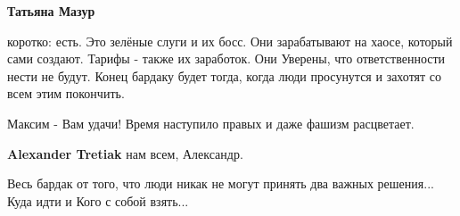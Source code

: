 \begin{itemize}
\begin{itemize} %
\textbf{Татьяна Мазур} 

коротко: есть. Это зелёные слуги и их босс. Они зарабатывают на хаосе, который
сами создают. Тарифы - также их заработок. Они Уверены, что ответственности
нести не будут. Конец бардаку будет тогда, когда люди просунутся и захотят со
всем этим покончить.

\end{itemize} %


Максим - Вам удачи! Время наступило правых и даже фашизм расцветает.

\textbf{Alexander Tretiak} нам всем, Александр.


Весь бардак от того, что люди никак не могут принять два важных решения...
Куда идти и Кого с собой взять...

\end{itemize} %
